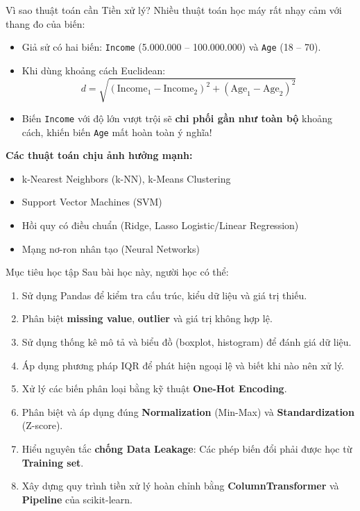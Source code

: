 \documentclass[aspectratio=169,11pt]{beamer}
\newcommand{\code}[1]{\texttt{#1}}
\newcommand{\smallgap}{\vspace{0.35em}}
\begin{document}
\begin{frame}{Vì sao thuật toán cần Tiền xử lý?}
Nhiều thuật toán học máy rất nhạy cảm với thang đo của biến:
\begin{itemize}
  \item Giả sử có hai biến: \code{Income} (5.000.000 -- 100.000.000) và \code{Age} (18 -- 70).
  \item Khi dùng khoảng cách Euclidean:
  \[
  d = \sqrt{(\text{Income}_1 - \text{Income}_2)^2 + (\text{Age}_1 - \text{Age}_2)^2}
  \]
  \item Biến \code{Income} với độ lớn vượt trội sẽ \textbf{chi phối gần như toàn bộ} khoảng cách, khiến biến \code{Age} mất hoàn toàn ý nghĩa!
\end{itemize}

\smallgap
\textbf{Các thuật toán chịu ảnh hưởng mạnh:}
\begin{itemize}
  \item k-Nearest Neighbors (k-NN), k-Means Clustering
  \item Support Vector Machines (SVM)
  \item Hồi quy có điều chuẩn (Ridge, Lasso Logistic/Linear Regression)
  \item Mạng nơ-ron nhân tạo (Neural Networks)
\end{itemize}
\end{frame}

\begin{frame}{Mục tiêu học tập}
Sau bài học này, người học có thể:
\begin{enumerate}
  \item Sử dụng Pandas để kiểm tra cấu trúc, kiểu dữ liệu và giá trị thiếu.
  \item Phân biệt \textbf{missing value}, \textbf{outlier} và giá trị không hợp lệ.
  \item Sử dụng thống kê mô tả và biểu đồ (boxplot, histogram) để đánh giá dữ liệu.
  \item Áp dụng phương pháp IQR để phát hiện ngoại lệ và biết khi nào nên xử lý.
  \item Xử lý các biến phân loại bằng kỹ thuật \textbf{One-Hot Encoding}.
  \item Phân biệt và áp dụng đúng \textbf{Normalization} (Min-Max) và \textbf{Standardization} (Z-score).
  \item Hiểu nguyên tắc \textbf{chống Data Leakage}: Các phép biến đổi phải được học từ \textbf{Training set}.
  \item Xây dựng quy trình tiền xử lý hoàn chỉnh bằng \textbf{ColumnTransformer} và \textbf{Pipeline} của scikit-learn.
\end{enumerate}
\end{frame}
\end{document}
